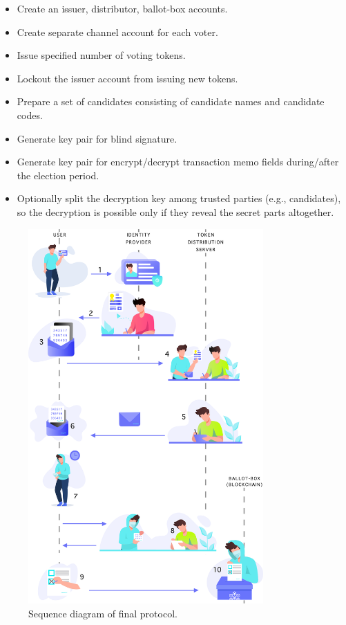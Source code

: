 \documentclass[applsci,article,accept,moreauthors,pdftex]{Definitions/mdpi}
\begin{document}
\begin{itemize}
        \item Create an issuer, distributor, ballot-box accounts.
        \item Create separate channel account for each voter.
        \item Issue specified number of voting tokens.
        \item Lockout the issuer account from issuing new tokens.
        \item Prepare a set of candidates consisting of candidate names and candidate codes.
        \item Generate key pair for blind signature.
        \item Generate key pair for encrypt/decrypt  transaction memo fields during/after the election period.
       \item Optionally split the decryption key among trusted parties (e.g., candidates), so the decryption is possible only if they reveal the secret parts altogether.
\end{itemize}


\begin{figure}[H]
\includegraphics[width=9cm]{figs/protocol-diagram.png}
\centering
\caption{Sequence diagram of final protocol.}
\label{fig:sequence-diagram}
\end{figure} 
\end{document}
